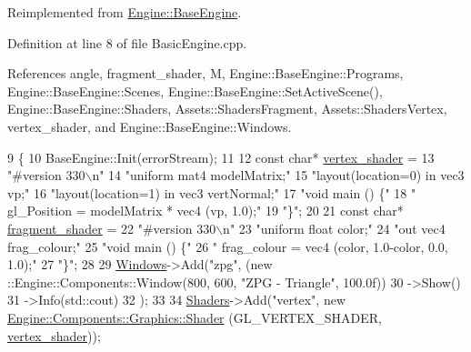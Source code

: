 Reimplemented from \mbox{\hyperlink{classEngine_1_1BaseEngine_ad9c141fe48c8c91e14e77ed5fcb90196}{Engine\+::\+Base\+Engine}}.



Definition at line 8 of file Basic\+Engine.\+cpp.



References angle, fragment\+\_\+shader, M, Engine\+::\+Base\+Engine\+::\+Programs, Engine\+::\+Base\+Engine\+::\+Scenes, Engine\+::\+Base\+Engine\+::\+Set\+Active\+Scene(), Engine\+::\+Base\+Engine\+::\+Shaders, Assets\+::\+Shaders\+Fragment, Assets\+::\+Shaders\+Vertex, vertex\+\_\+shader, and Engine\+::\+Base\+Engine\+::\+Windows.


\begin{DoxyCode}
9 \{
10     BaseEngine::Init(errorStream);
11 
12     \textcolor{keyword}{const} \textcolor{keywordtype}{char}* \mbox{\hyperlink{ZPGEngine_8cpp_afc33b8912f9f93d1d2544df04ad4a81a}{vertex\_shader}} =
13         \textcolor{stringliteral}{"#version 330\(\backslash\)n"}
14         \textcolor{stringliteral}{"uniform mat4 modelMatrix;"}
15         \textcolor{stringliteral}{"layout(location=0) in vec3 vp;"}
16         \textcolor{stringliteral}{"layout(location=1) in vec3 vertNormal;"}
17         \textcolor{stringliteral}{"void main () \{"}
18         \textcolor{stringliteral}{" gl\_Position = modelMatrix * vec4 (vp, 1.0);"}
19         \textcolor{stringliteral}{"\}"};
20 
21     \textcolor{keyword}{const} \textcolor{keywordtype}{char}*  \mbox{\hyperlink{ZPGEngine_8cpp_ab187f2ba2a2f72ea5571921a1a856582}{fragment\_shader}} =
22         \textcolor{stringliteral}{"#version 330\(\backslash\)n"}
23         \textcolor{stringliteral}{"uniform float color;"}
24         \textcolor{stringliteral}{"out vec4 frag\_colour;"}
25         \textcolor{stringliteral}{"void main () \{"}
26         \textcolor{stringliteral}{"     frag\_colour = vec4 (color, 1.0-color, 0.0, 1.0);"}
27         \textcolor{stringliteral}{"\}"};
28 
29     \mbox{\hyperlink{classEngine_1_1BaseEngine_a4a1a4c4dae052e66ecc4f326eeed4d33}{Windows}}->Add(\textcolor{stringliteral}{"zpg"}, (new ::Engine::Components::Window(800, 600, \textcolor{stringliteral}{"ZPG - Triangle"}, 100.0f))
30         ->Show()
31         ->Info(std::cout)
32     );
33 
34     \mbox{\hyperlink{classEngine_1_1BaseEngine_a2582dee3f73da82bb422b43317b85e3b}{Shaders}}->Add(\textcolor{stringliteral}{"vertex"}, \textcolor{keyword}{new} \mbox{\hyperlink{classEngine_1_1Components_1_1Graphics_1_1Shader}{Engine::Components::Graphics::Shader}}
      (GL\_VERTEX\_SHADER, \mbox{\hyperlink{ZPGEngine_8cpp_afc33b8912f9f93d1d2544df04ad4a81a}{vertex\_shader}}));

\end{DoxyCode}
